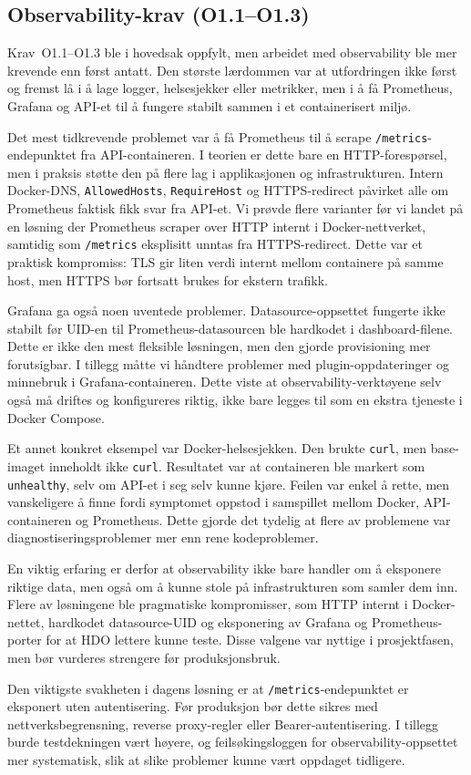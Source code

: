 \subsection{Observability-krav (O1.1--O1.3)}
\label{sec:eval-observability}

Krav~O1.1--O1.3 ble i hovedsak oppfylt, men arbeidet med observability
ble mer krevende enn først antatt. Den største lærdommen var at
utfordringen ikke først og fremst lå i å lage logger, helsesjekker eller
metrikker, men i å få Prometheus, Grafana og API-et til å fungere stabilt
sammen i et containerisert miljø.

Det mest tidkrevende problemet var å få Prometheus til å scrape
\texttt{/metrics}-endepunktet fra API-containeren. I teorien er dette bare
en HTTP-forespørsel, men i praksis støtte den på flere lag i
applikasjonen og infrastrukturen. Intern Docker-DNS, \texttt{AllowedHosts},
\texttt{RequireHost} og HTTPS-redirect påvirket alle om Prometheus faktisk
fikk svar fra API-et. Vi prøvde flere varianter før vi landet på en løsning
der Prometheus scraper over HTTP internt i Docker-nettverket, samtidig som
\texttt{/metrics} eksplisitt unntas fra HTTPS-redirect. Dette var et
praktisk kompromiss: TLS gir liten verdi internt mellom containere på samme
host, men HTTPS bør fortsatt brukes for ekstern trafikk.

Grafana ga også noen uventede problemer. Datasource-oppsettet fungerte
ikke stabilt før UID-en til Prometheus-datasourcen ble hardkodet i
dashboard-filene. Dette er ikke den mest fleksible løsningen, men den gjorde
provisioning mer forutsigbar. I tillegg måtte vi håndtere problemer med
plugin-oppdateringer og minnebruk i Grafana-containeren. Dette viste at
observability-verktøyene selv også må driftes og konfigureres riktig, ikke
bare legges til som en ekstra tjeneste i Docker Compose.

Et annet konkret eksempel var Docker-helsesjekken. Den brukte
\texttt{curl}, men base-imaget inneholdt ikke \texttt{curl}. Resultatet var
at containeren ble markert som \texttt{unhealthy}, selv om API-et i seg selv
kunne kjøre. Feilen var enkel å rette, men vanskeligere å finne fordi
symptomet oppstod i samspillet mellom Docker, API-containeren og
Prometheus. Dette gjorde det tydelig at flere av problemene var
diagnostiseringsproblemer mer enn rene kodeproblemer.

En viktig erfaring er derfor at observability ikke bare handler om å
eksponere riktige data, men også om å kunne stole på infrastrukturen som
samler dem inn. Flere av løsningene ble pragmatiske kompromisser, som HTTP
internt i Docker-nettet, hardkodet datasource-UID og eksponering av Grafana
og Prometheus-porter for at HDO lettere kunne teste. Disse valgene var
nyttige i prosjektfasen, men bør vurderes strengere før produksjonsbruk.

Den viktigste svakheten i dagens løsning er at \texttt{/metrics}-endepunktet
er eksponert uten autentisering. Før produksjon bør dette sikres med
nettverksbegrensning, reverse proxy-regler eller Bearer-autentisering. I
tillegg burde testdekningen vært høyere, og feilsøkingsloggen for
observability-oppsettet mer systematisk, slik at slike problemer kunne vært
oppdaget tidligere.